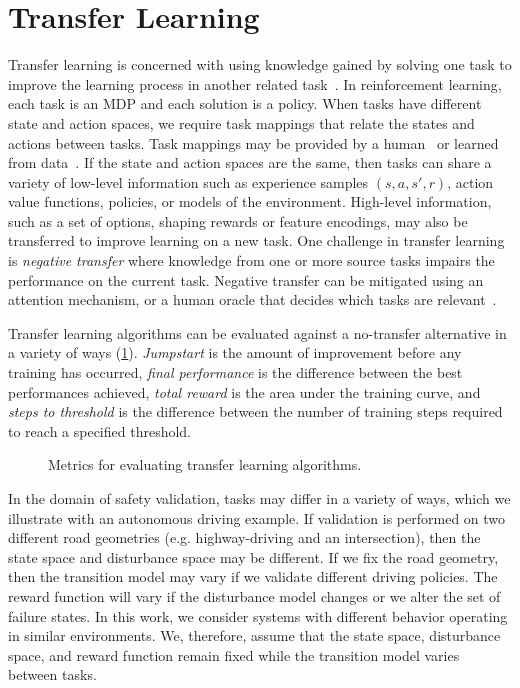\section{Transfer Learning}
Transfer learning is concerned with using knowledge gained by solving one task to improve the learning process in another related task~\cite{taylor2009transfer}. In reinforcement learning, each task is an MDP and each solution is a policy. When tasks have different state and action spaces, we require task mappings that relate the states and actions between tasks. Task mappings may be provided by a human~\cite{taylor2007transfer} or learned from data~\cite{taylor2008autonomous}. If the state and action spaces are the same, then tasks can share a variety of low-level information such as experience samples $(s, a, s', r)$, action value functions, policies, or models of the environment. High-level information, such as a set of options, shaping rewards or feature encodings, may also be transferred to improve learning on a new task. One challenge in transfer learning is \emph{negative transfer} where knowledge from one or more source tasks impairs the performance on the current task. Negative transfer can be mitigated using an attention mechanism, or a human oracle that decides which tasks are relevant~\cite{taylor2009transfer}. 

Transfer learning algorithms can be evaluated against a no-transfer alternative in a variety of ways (\cref{fig:transfer_metrics}). \emph{Jumpstart} is the amount of improvement before any training has occurred, \emph{final performance} is the difference between the best performances achieved, \emph{total reward} is the area under the training curve,  and \emph{steps to threshold} is the difference between the number of training steps required to reach a specified threshold.

\begin{figure}
\centering

\caption{Metrics for evaluating transfer learning algorithms. }
\label{fig:transfer_metrics}
\end{figure}

In the domain of safety validation, tasks may differ in a variety of ways, which we illustrate with an autonomous driving example. If validation is performed on two different road geometries (e.g. highway-driving  and an intersection), then the state space and disturbance space may be different. If we fix the road geometry, then the transition model may vary if we validate different driving policies. The reward function will vary if the disturbance model changes or we alter the set of failure states. In this work, we consider systems with different behavior operating in similar environments. We, therefore, assume that the state space, disturbance space, and reward function remain fixed while the transition model varies between tasks.

